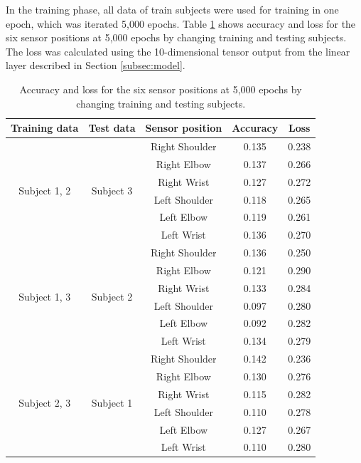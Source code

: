 \documentclass[graybox]{svmult}
\begin{document}
In the training phase, all data of train subjects were used for training in one epoch, which was iterated 5,000 epochs. Table \ref{tab:result} shows accuracy and loss for the six sensor positions at 5,000 epochs by changing training and testing subjects. The loss was calculated using the 10-dimensional tensor output from the linear layer described in Section \ref{subsec:model}.

\begin{table}[ht]
    \centering
    \caption{Accuracy and loss for the six sensor positions at 5,000 epochs by changing training and testing subjects.}
    \label{tab:result}
    \begin{tabular}{c|c|c|c|c}\hline\hline
    Training data & Test data & Sensor position & Accuracy & Loss \\ \hline
    \multirow{6}{*}{Subject 1, 2} & \multirow{6}{*}{Subject 3} & Right Shoulder & 0.135 & 0.238 \\
    & & Right Elbow & 0.137 & 0.266 \\
    & & Right Wrist & 0.127 & 0.272 \\
    & & Left Shoulder & 0.118 & 0.265 \\
    & & Left Elbow & 0.119 & 0.261 \\
    & & Left Wrist & 0.136 & 0.270 \\ \cline{1-5}
    \multirow{6}{*}{Subject 1, 3} & \multirow{6}{*}{Subject 2} & Right Shoulder & 0.136 & 0.250 \\
    & & Right Elbow & 0.121 & 0.290 \\
    & & Right Wrist & 0.133 & 0.284 \\
    & & Left Shoulder & 0.097 & 0.280 \\
    & & Left Elbow & 0.092 & 0.282 \\
    & & Left Wrist & 0.134 & 0.279 \\ \cline{1-5}
    \multirow{6}{*}{Subject 2, 3} & \multirow{6}{*}{Subject 1} & Right Shoulder & 0.142 & 0.236 \\
    & & Right Elbow & 0.130 & 0.276 \\
    & & Right Wrist & 0.115 & 0.282 \\
    & & Left Shoulder & 0.110 & 0.278 \\
    & & Left Elbow & 0.127 & 0.267 \\
    & & Left Wrist & 0.110 & 0.280 \\ \hline
    \end{tabular}
\end{table}
\end{document}
